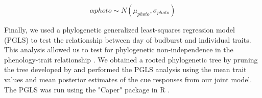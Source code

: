 \documentclass{article}\usepackage[]{graphicx}\usepackage[]{color}
\begin{document}
\begin{equation}
\label{alphaptotec}
\alpha photo  \sim N(\mu_{photo}, \sigma_{photo}) 
\end{equation}




Finally, we used a phylogenetic generalized least-squares regression model (PGLS) to test the relationship between day of budburst and individual traits. This analysis allowed us to test for phylogenetic non-independence in the phenology-trait relationship \citep{Freckleton2002}. We obtained a rooted phylogenetic tree by pruning the tree developed by \citep{Smith2018} and performed the PGLS analysis using the mean trait values and mean posterior estimates of the cue responses from our joint model. The PGLS was run using the "Caper" package in R \citep{Orne2013}. \\
\end{document}
